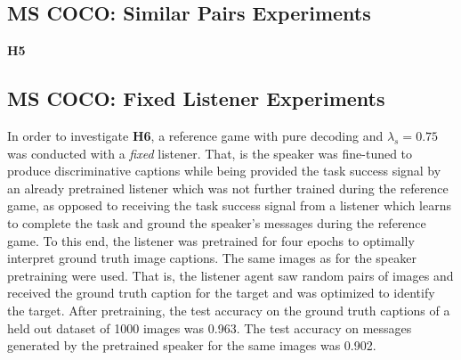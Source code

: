 
\subsection{MS COCO: Similar Pairs Experiments}

\textbf{H5}


\subsection{MS COCO: Fixed Listener Experiments}
\label{exp:coco_fixed_listener}
In order to investigate \textbf{H6}, a reference game with pure decoding and $\lambda_s=0.75$ was conducted with a \emph{fixed} listener. That, is the speaker was fine-tuned to produce discriminative captions while being provided the task success signal by an already pretrained listener which was not further trained during the reference game, as opposed to receiving the task success signal from a listener which learns to complete the task and ground the speaker's messages during the reference game. To this end, the listener was pretrained for four epochs to optimally interpret ground truth image captions. The same images as for the speaker pretraining were used. That is, the listener agent saw random pairs of images and received the ground truth caption for the target and was optimized to identify the target. After pretraining, the test accuracy on the ground truth captions of a held out dataset of 1000 images was 0.963. The test accuracy on messages generated by the pretrained speaker for the same images was 0.902.

